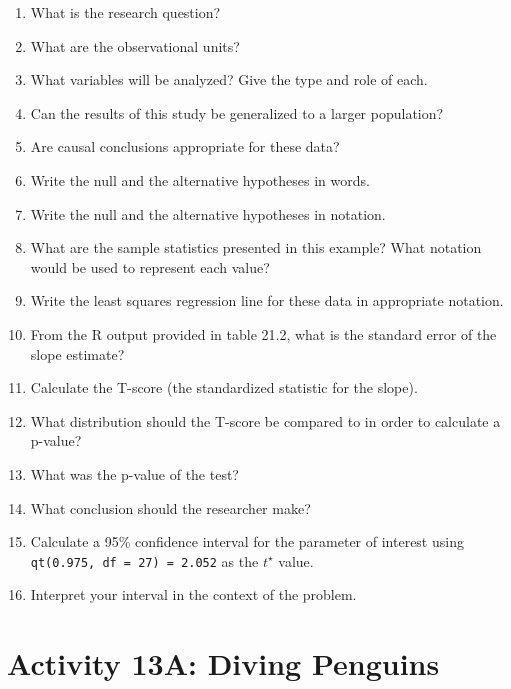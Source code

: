 \documentclass[
]{report}
\newcommand{\rgs}{\vspace{12pt}} %
\begin{document}
\begin{enumerate}
\def\labelenumi{\arabic{enumi}.}
\item
  What is the research question?
  \rgs
\item
  What are the observational units?
  \rgs
\item
  What variables will be analyzed? Give the type and role of each.
  \rgs
  \rgs
\item
  Can the results of this study be generalized to a larger population?
  \rgs
\item
  Are causal conclusions appropriate for these data?
  \rgs
\item
  Write the null and the alternative hypotheses in words.
  \rgs
  \rgs
\item
  Write the null and the alternative hypotheses in notation.
  \rgs
\item
  What are the sample statistics presented in this example? What notation would be used to represent each value?
  \rgs
\item
  Write the least squares regression line for these data in appropriate notation.
  \rgs
\item
  From the R output provided in table 21.2, what is the standard error of the slope estimate?
  \rgs
\item
  Calculate the T-score (the standardized statistic for the slope).
  \rgs
  \rgs
\item
  What distribution should the T-score be compared to in order to calculate a p-value?
  \rgs
\item
  What was the p-value of the test?
  \rgs
\item
  What conclusion should the researcher make?
  \rgs
  \rgs
\item
  Calculate a 95\% confidence interval for the parameter of interest using \texttt{qt(0.975,\ df\ =\ 27)\ =\ 2.052} as the \(t^\star\) value.
  \rgs
  \rgs
\item
  Interpret your interval in the context of the problem.
  \rgs
  \rgs
\end{enumerate}

\newpage

\hypertarget{activity-13a-diving-penguins}{%
\section{Activity 13A: Diving Penguins}\label{activity-13a-diving-penguins}}

\end{document}
